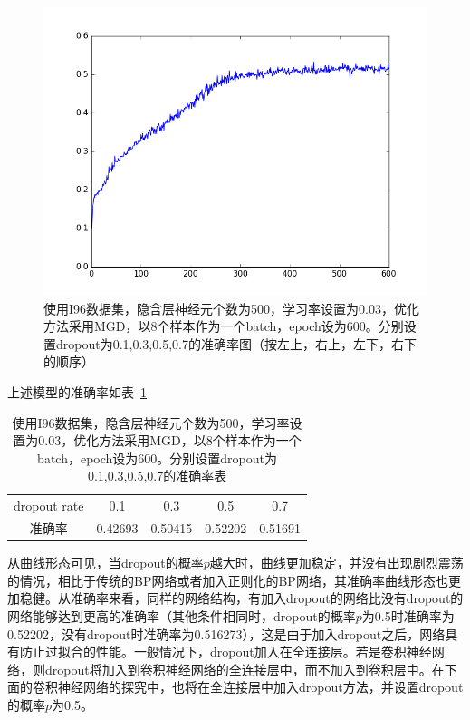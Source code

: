 \begin{figure}[htb]
\includegraphics[scale=0.35]{../figures/Log/BP_new1_5/BP_new1_5_acc.png} 
\caption{使用I96数据集，隐含层神经元个数为500，学习率设置为0.03，优化方法采用MGD，以8个样本作为一个batch，epoch设为600。分别设置dropout为0.1,0.3,0.5,0.7的准确率图（按左上，右上，左下，右下的顺序）}
\label{fig:bp11}
\end{figure}

上述模型的准确率如表~\ref{table:bp3}
\begin{table}[htb]
\centering
\caption{使用I96数据集，隐含层神经元个数为500，学习率设置为0.03，优化方法采用MGD，以8个样本作为一个batch，epoch设为600。分别设置dropout为0.1,0.3,0.5,0.7的准确率表}
\begin{tabular}{ccccc}
\toprule[2pt]
dropout rate & 0.1 & 0.3 & 0.5 & 0.7 \\ 
准确率 & 0.42693 & 0.50415 & 0.52202 & 0.51691 \\ 
\bottomrule[2pt]
\end{tabular} 
\label{table:bp3}
\end{table}
从曲线形态可见，当dropout的概率$p$越大时，曲线更加稳定，并没有出现剧烈震荡的情况，相比于传统的BP网络或者加入正则化的BP网络，其准确率曲线形态也更加稳健。从准确率来看，同样的网络结构，有加入dropout的网络比没有dropout的网络能够达到更高的准确率（其他条件相同时，dropout的概率$p$为0.5时准确率为0.52202，没有dropout时准确率为0.516273），这是由于加入dropout之后，网络具有防止过拟合的性能。一般情况下，dropout加入在全连接层。若是卷积神经网络，则dropout将加入到卷积神经网络的全连接层中，而不加入到卷积层中。在下面的卷积神经网络的探究中，也将在全连接层中加入dropout方法，并设置dropout的概率$p$为0.5。

